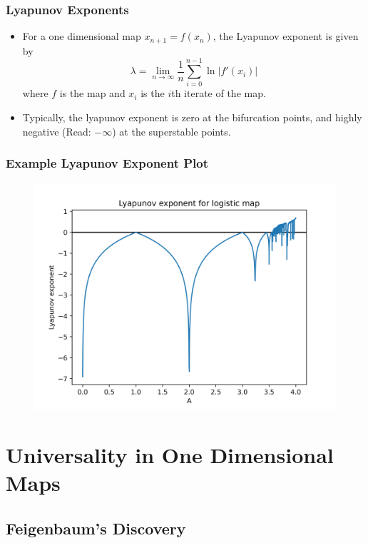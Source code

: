 \documentclass[
	11pt, %
	aspectratio=169, %
]{beamer}
\begin{document}

\begin{frame}
	\frametitle{Lyapunov Exponents}
    \begin{itemize}
        \item For a one dimensional map $x_{n+1} = f(x_n)$, the Lyapunov exponent is given by
        \begin{equation}
            \lambda = \lim_{n \to \infty} \frac{1}{n} \sum_{i=0}^{n-1} \ln \left| f'(x_i) \right|
        \end{equation}
        where $f$ is the map and $x_i$ is the $i$th iterate of the map. \pause
        \item Typically, the lyapunov exponent is zero at the bifurcation points, and highly negative (Read: $-\infty$) at the superstable points.
    \end{itemize}
\end{frame}


\begin{frame}
	\frametitle{Example Lyapunov Exponent Plot}
    \begin{figure}
        \includegraphics[width=0.6\linewidth]{logistic_lyapunov_exp.png}
    \end{figure}
\end{frame}


\section{Universality in One Dimensional Maps}
\subsection{Feigenbaum's Discovery}
\end{document}
